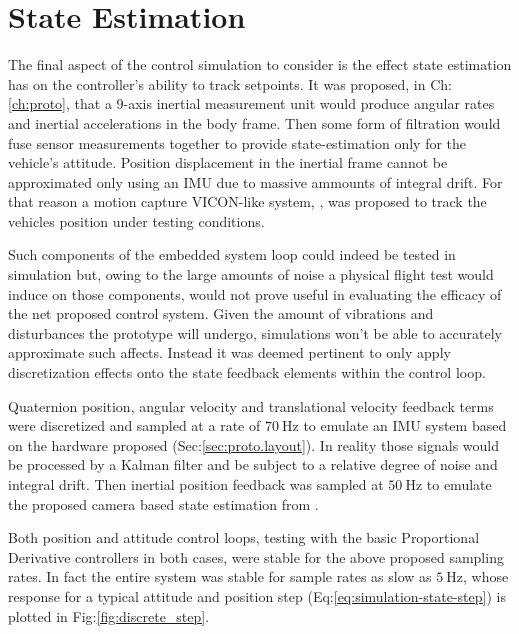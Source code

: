 \section{State Estimation}
\label{sec:simulation.state}
The final aspect of the control simulation to consider is the effect state estimation has on the controller's ability to track setpoints. It was proposed, in Ch:\ref{ch:proto}, that a 9-axis inertial measurement unit would produce angular rates and inertial accelerations in the body frame. Then some form of filtration would fuse sensor measurements together to provide state-estimation only for the vehicle's attitude. Position displacement in the inertial frame cannot be approximated only using an IMU due to massive ammounts of integral drift. For that reason a motion capture VICON-like system, \cite{arnold}, was proposed to track the vehicles position under testing conditions. 
\par
Such components of the embedded system loop could indeed be tested in simulation but, owing to the large amounts of noise a physical flight test would induce on those components, would not prove useful in evaluating the efficacy of the net proposed control system. Given the amount of vibrations and disturbances the prototype will undergo, simulations won't be able to accurately approximate such affects. Instead it was deemed pertinent to only apply discretization effects onto the state feedback elements within the control loop.
\par
Quaternion position, angular velocity and translational velocity feedback terms were discretized and sampled at a rate of $70~\text{Hz}$ to emulate an IMU system based on the hardware proposed (Sec:\ref{sec:proto.layout}). In reality those signals would be processed by a Kalman filter and be subject to a relative degree of noise and integral drift. Then inertial position feedback was sampled at $50~\text{Hz}$ to emulate the proposed camera based state estimation from \cite{arnold}.
\par
Both position and attitude control loops, testing with the basic Proportional Derivative controllers in both cases, were stable for the above proposed sampling rates. In fact the entire system was stable for sample rates as slow as $5~\text{Hz}$, whose response for a typical attitude and position step (Eq:\ref{eq:simulation-state-step}) is plotted in Fig:\ref{fig:discrete_step}.
